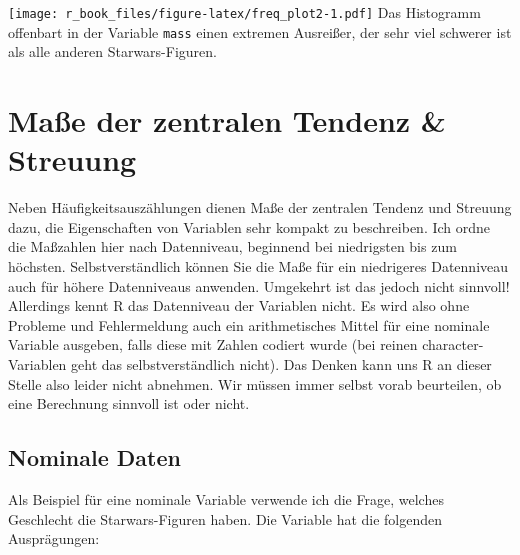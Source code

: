 \documentclass[
]{book}
\newenvironment{Shaded}{\begin{snugshade}}{\end{snugshade}}
\newcommand{\AttributeTok}[1]{\textcolor[rgb]{0.77,0.63,0.00}{#1}}
\newcommand{\FunctionTok}[1]{\textcolor[rgb]{0.00,0.00,0.00}{#1}}
\newcommand{\NormalTok}[1]{#1}
\newcommand{\SpecialCharTok}[1]{\textcolor[rgb]{0.00,0.00,0.00}{#1}}
\newcommand{\StringTok}[1]{\textcolor[rgb]{0.31,0.60,0.02}{#1}}
\begin{document}
\begin{Shaded}
\end{Shaded}

\texttt{[image: r\_book\_files/figure-latex/freq\_plot2-1.pdf]}
Das Histogramm offenbart in der Variable \texttt{mass} einen extremen Ausreißer, der sehr viel schwerer ist als alle anderen Starwars-Figuren.

\hypertarget{mauxdfe-der-zentralen-tendenz-streuung}{%
\section{Maße der zentralen Tendenz \& Streuung}\label{mauxdfe-der-zentralen-tendenz-streuung}}

Neben Häufigkeitsauszählungen dienen Maße der zentralen Tendenz und Streuung dazu, die Eigenschaften von Variablen sehr kompakt zu beschreiben. Ich ordne die Maßzahlen hier nach Datenniveau, beginnend bei niedrigsten bis zum höchsten. Selbstverständlich können Sie die Maße für ein niedrigeres Datenniveau auch für höhere Datenniveaus anwenden. Umgekehrt ist das jedoch nicht sinnvoll! Allerdings kennt R das Datenniveau der Variablen nicht. Es wird also ohne Probleme und Fehlermeldung auch ein arithmetisches Mittel für eine nominale Variable ausgeben, falls diese mit Zahlen codiert wurde (bei reinen character-Variablen geht das selbstverständlich nicht). Das Denken kann uns R an dieser Stelle also leider nicht abnehmen. Wir müssen immer selbst vorab beurteilen, ob eine Berechnung sinnvoll ist oder nicht.

\hypertarget{nominale-daten}{%
\subsection{Nominale Daten}\label{nominale-daten}}

Als Beispiel für eine nominale Variable verwende ich die Frage, welches Geschlecht die Starwars-Figuren haben. Die Variable hat die folgenden Ausprägungen:

\begin{Shaded}
\end{Shaded}
\end{document}
